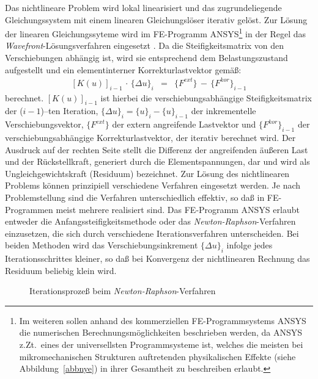 %
Das nichtlineare Problem wird lokal linearisiert und das zugrundeliegende
Gleichungssystem mit einem linearen Gleichungslöser iterativ gelöst. Zur
Lösung der linearen Gleichungssyteme wird im FE-Programm
{\sf ANSYS}\footnote{Im
weiteren sollen anhand des kommerziellen FE-Programmsystems {\sf ANSYS}
\cite{SASI} die numerischen Berechnungsmöglichkeiten beschrieben werden,
da {\sf ANSYS} z.Zt.\ eines der universellsten Programmsysteme ist,
welches die meisten bei mikromechanischen Strukturen auftretenden
physikalischen Effekte (siehe Abbildung~\ref{abbnye}) in ihrer Gesamtheit
zu beschreiben erlaubt.} in der Regel
das {\em Wavefront}-Lösungsverfahren eingesetzt \cite{Koh92}. Da die
Steifigkeitsmatrix von den Verschiebungen abhängig ist, wird sie
entsprechend dem Belastungszustand aufgestellt und ein elementinterner
Korrekturlastvektor gemäß:
\begin{eqnarray}
\label{largedefl}
  [K(u)]_{i-1} \, \cdot \, \{\Delta u\}_{i} & = &
  \{F^{ext}\} \, - \, \{F^{kor}\}_{i-1}
\end{eqnarray}
berechnet. $[K(u)]_{i-1}$ ist hierbei die verschiebungsabhängige
Steifigkeitsmatrix der ($i-1$)--ten Iteration,
$\{\Delta u\}_{i} = \{u\}_{i} - \{u\}_{i-1}$ der inkrementelle
Verschiebungsvektor, $\{F^{ext}\}$ der extern angreifende Lastvektor und
$\{F^{kor}\}_{i-1}$ der verschiebungsabhängige Korrekturlastvektor, der
iterativ berechnet wird. Der Ausdruck auf der rechten Seite stellt die
Differenz der angreifenden äußeren Last und der Rückstellkraft, generiert
durch die Elementspannungen, dar und wird als Ungleichgewichtskraft
(Residuum) bezeichnet. Zur Lösung des nichtlinearen Problems können
prinzi\-piell verschiedene Verfahren eingesetzt werden.
Je nach Problemstellung sind
die Verfahren unterschiedlich effektiv, so daß in FE-Programmen meist
mehrere realisiert sind. Das FE-Programm {\sf ANSYS} erlaubt entweder
die Anfangssteifigkeitsmethode %
oder das {\sl Newton-Raphson}-Verfahren einzusetzen, die sich durch
verschiedene Iterationsverfahren unterscheiden.
Bei beiden Methoden wird das Verschiebungsinkrement $\{\Delta u\}_{i}$
infolge jedes Iterationsschrittes kleiner, so daß bei Konvergenz der
nichtlinearen Rechnung das Residuum beliebig klein wird.\\
\begin{figure}[htb]
\begin{center}

\setabbdz
\end{center}
\caption{\label{abbnr}
 Iterationsprozeß beim {\sl Newton-Raphson}-Verfahren}
\end{figure}
